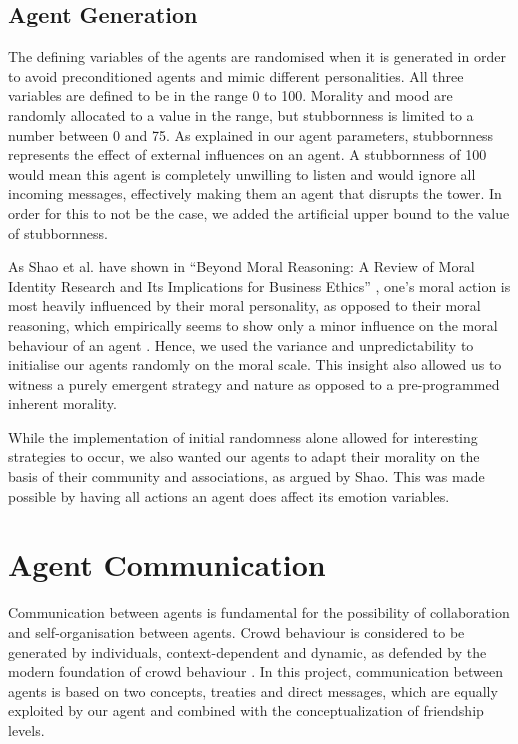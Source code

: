 \subsection{Agent Generation}
The defining variables of the agents are randomised when it is generated in order to avoid preconditioned agents and mimic different personalities. All three variables are defined to be in the range 0 to 100. Morality and mood are randomly allocated to a value in the range, but stubbornness is limited to a number between 0 and 75. As explained in our agent parameters, stubbornness represents the effect of external influences on an agent. A stubbornness of 100 would mean this agent is completely unwilling to listen and would ignore all incoming messages, effectively making them an agent that disrupts the tower. In order for this to not be the case, we added the artificial upper bound to the value of stubbornness.\par 
As Shao et al. have shown in “Beyond Moral Reasoning: A Review of Moral Identity Research and Its Implications for Business Ethics” \cite{shao_aquino_freeman_2008}, one’s moral action is most heavily influenced by their moral personality, as opposed to their moral reasoning, which empirically seems to show only a minor influence on the moral behaviour of an agent \cite{blasi_1983}. Hence, we used the variance and unpredictability to initialise our agents randomly on the moral scale. This insight also allowed us to witness a purely emergent strategy and nature as opposed to a pre-programmed inherent morality.\par 
While the implementation of initial randomness alone allowed for interesting strategies to occur, we also wanted our agents to adapt their morality on the basis of their community and associations, as argued by Shao. This was made possible by having all actions an agent does affect its emotion variables. \par 

\section{Agent Communication}\label{sec:agent_communication}
Communication between agents is fundamental for the possibility of collaboration and self-organisation between agents. Crowd behaviour is considered to be generated by individuals, context-dependent and dynamic, as defended by the modern foundation of crowd behaviour \cite{0d9bc1ee81234780b2bb6ecd02762d56}. In this project, communication between agents is based on two concepts, treaties and direct messages, which are equally exploited by our agent and combined with the conceptualization of friendship levels. 

